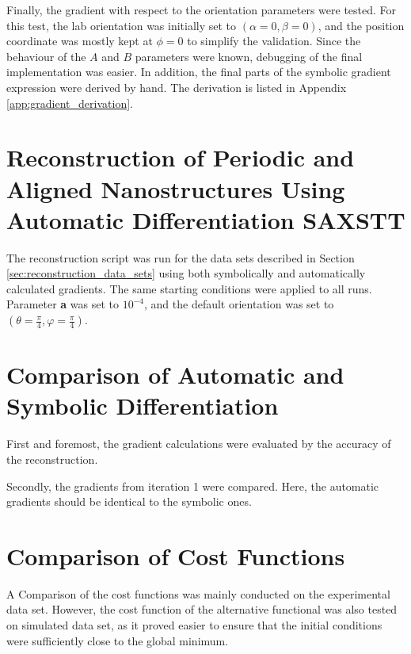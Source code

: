 Finally, the gradient with respect to the orientation parameters were tested.
For this test, the lab orientation was initially set to $\left( \alpha = 0, \beta = 0 \right)$, and the position coordinate was mostly kept at $\phi = 0$ to simplify the validation.
Since the behaviour of the $A$ and $B$ parameters were known, debugging of the final implementation was easier. %
In addition, the final parts of the symbolic gradient expression were derived by hand. The derivation is listed in Appendix \ref{app:gradient_derivation}.




\section{Reconstruction of Periodic and Aligned Nanostructures Using Automatic Differentiation SAXSTT}


The reconstruction script was run for the data sets described in Section \ref{sec:reconstruction_data_sets} using both symbolically and automatically calculated gradients.
The same starting conditions were applied to all runs.
Parameter \textbf{a} was set to $10^{-4}$, and the default orientation was set to $\left( \theta = \frac{\pi}{4}, \varphi = \frac{\pi}{4} \right)$.





\section{Comparison of Automatic and Symbolic Differentiation}



First and foremost, the gradient calculations were evaluated by the accuracy of the reconstruction.

Secondly, the gradients from iteration 1 were compared. Here, the automatic gradients should be identical to the symbolic ones.

\section{Comparison of Cost Functions}%

A Comparison of the cost functions was mainly conducted on the experimental data set.
However, the cost function of the alternative functional was also tested on simulated data set,
as it proved easier to ensure that the initial conditions were sufficiently close to the global minimum.